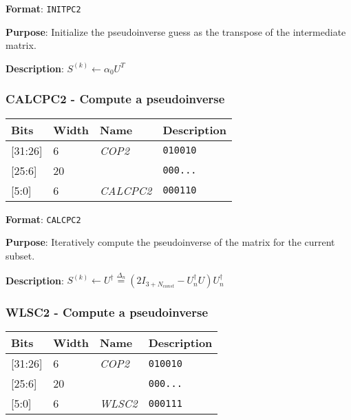 \documentclass[11pt]{article}
\begin{document}
\textbf{Format}: \texttt{INITPC2}

\textbf{Purpose}: Initialize the pseudoinverse guess as the transpose of the intermediate matrix.

\textbf{Description}: $S^{(k)} \leftarrow \alpha_0 U^{T}$

\text{}
\subsubsection{CALCPC2 - Compute a pseudoinverse}
\text{}

\begin{table}[H] \centering
  \def\arraystretch{1.4}
  \begin{tabular}{|m{2cm}|m{1.5cm}|m{2.5cm}|m{4.5cm}|}
    \hline
    \textbf{Bits} & \textbf{Width} & \textbf{Name} & \textbf{Description}\\ \hline

    [31:26] & 6 & \emph{COP2} & \texttt{010010}\\ \hline

    [25:6] & 20 & & \texttt{000...}\\ \hline

    [5:0] & 6 & \emph{CALCPC2} & \texttt{000110}\\ \hline
  \end{tabular}
\end{table}

\textbf{Format}: \texttt{CALCPC2}

\textbf{Purpose}: Iteratively compute the pseudoinverse of the matrix for the current subset.

\textbf{Description}: $S^{(k)} \leftarrow U^{\dagger} \stackrel{\Delta_n}{=} (2I_{3+N_{const}} - U^{\dagger}_n U) U^{\dagger}_n$

\text{}
\subsubsection{WLSC2 - Compute a pseudoinverse}
\text{}

\begin{table}[H] \centering
  \def\arraystretch{1.4}
  \begin{tabular}{|m{2cm}|m{1.5cm}|m{2.5cm}|m{4.5cm}|}
    \hline
    \textbf{Bits} & \textbf{Width} & \textbf{Name} & \textbf{Description}\\ \hline

    [31:26] & 6 & \emph{COP2} & \texttt{010010}\\ \hline

    [25:6] & 20 & & \texttt{000...}\\ \hline

    [5:0] & 6 & \emph{WLSC2} & \texttt{000111}\\ \hline
  \end{tabular}
\end{table}
\end{document}

